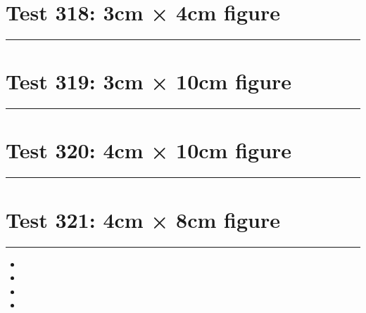 \documentclass[a4paper,11pt]{article}
\begin{document}
\section*{Test 318: 3cm × 4cm figure}
\begin{swarmwrap}%
  \begin{minipage}[t]{3cm}
    \centering
    \rule{\linewidth}{4cm}
  \end{minipage}%
\end{swarmwrap}%
\swarmwrapnext
\lipsum[34]
\lipsum[35]
\lipsum[36]
\section*{Test 319: 3cm × 10cm figure}
\begin{swarmwrap}%
  \begin{minipage}[t]{3cm}
    \centering
    \rule{\linewidth}{10cm}
  \end{minipage}%
\end{swarmwrap}%
\swarmwrapnext
\lipsum[99]
\lipsum[100]
\lipsum[101]
\lipsum[102]
\lipsum[103]
\section*{Test 320: 4cm × 10cm figure}
\begin{swarmwrap}%
  \begin{minipage}[t]{4cm}
    \centering
    \rule{\linewidth}{10cm}
  \end{minipage}%
\end{swarmwrap}%
\swarmwrapnext
\lipsum[118]
\lipsum[119]
\lipsum[120]
\lipsum[121]
\lipsum[122]
\section*{Test 321: 4cm × 8cm figure}
\begin{swarmwrap}%
  \begin{minipage}[t]{4cm}
    \centering
    \rule{\linewidth}{8cm}
  \end{minipage}%
\end{swarmwrap}%
\swarmwrapnext
\lipsum[30]
\begin{itemize}
  \item \lipsum[31][1-3]
  \item \lipsum[32][1-3]
  \item \lipsum[33][1-3]
  \item \lipsum[34][1-3]
\end{itemize}
\end{document}
